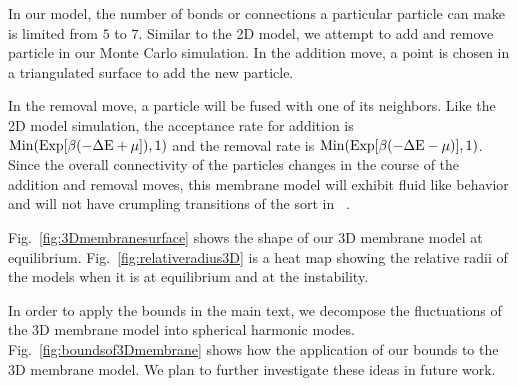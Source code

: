 \documentclass[amsmath,preprintnumbers,10pt,nofootinbib,prl,twocolumn]{revtex4-1}
\begin{document}
In our model, the number of bonds or connections a particular particle can make is limited from $5$ to $7$.  Similar to the 2D model, we attempt to add and remove particle in our Monte Carlo simulation. In the addition move, a point is chosen in a triangulated surface to add the new particle.  

 In the removal move, a particle will be fused with one of its neighbors. Like the 2D model simulation, the acceptance rate for addition is $\rm{Min}(\rm{Exp}[\beta(-\Delta E +\mu]),1)$ and the removal rate is $\rm{Min}(\rm{Exp}[\beta(-\Delta E -\mu)],1)$. Since the overall connectivity of the particles changes in the course of the addition and removal moves, this membrane model will exhibit fluid like behavior and will not have crumpling transitions of the sort in ~\cite{Paulose2012}.

Fig.~\ref{fig:3Dmembranesurface} shows the shape of our 3D membrane model at equilibrium. Fig.~\ref{fig:relativeradius3D} is a heat map showing the relative radii of the models when it is at equilibrium and at the instability.

In order to apply the bounds in the main text, we decompose the fluctuations of the 3D membrane model into spherical harmonic modes. Fig.~\ref{fig:boundsof3Dmembrane} shows how the application of our bounds to the 3D membrane model. We plan to further investigate these ideas in future work. 
\end{document}
